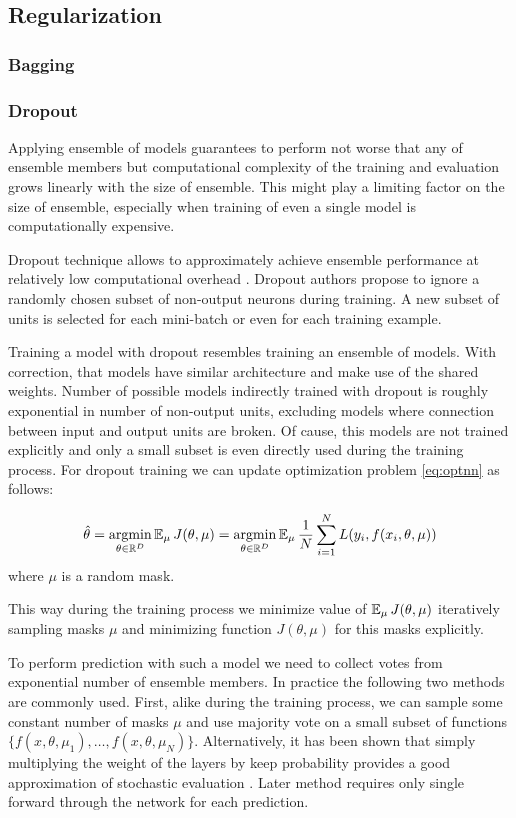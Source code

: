 \subsection{Regularization}

\subsubsection{Bagging}
\subsubsection{Dropout}

Applying ensemble of models guarantees to perform not worse that any of ensemble members but computational complexity of the training and evaluation grows linearly with the size of ensemble. This might play a limiting factor on the size of ensemble, especially when training of even a single model is computationally expensive.

Dropout technique allows to approximately achieve ensemble performance at relatively low computational overhead \cite{Srivastava2014}.
Dropout authors propose to ignore a randomly chosen subset of non-output neurons during training. A new subset of units is selected for each mini-batch or even for each training example.

Training a model with dropout resembles training an ensemble of models. With correction, that models have similar architecture and make use of the shared weights. Number of possible models indirectly trained with dropout is roughly exponential in number of non-output units, excluding models where connection between input and output units are broken. Of cause, this models are not trained explicitly and only a small subset is even directly used during the training process. For dropout training we can update optimization problem \ref{eq:optnn} as follows:

\begin{equation}\label{eq:optnndo}
  \hat{\theta} = \operatorname*{argmin}_{\theta \in \Bbb{R}^D} \operatorname{\mathbb{E}}_\mu J(\theta, \mu) = \operatorname*{argmin}_{\theta \in \Bbb{R}^D} \operatorname{\mathbb{E}}_\mu \frac{1}{N} \sum_{i=1}^{N} L(y_i, f(x_i, \theta, \mu))
\end{equation}
where $\mu$ is a random mask.

This way during the training process we minimize value of $\operatorname{\mathbb{E}}_\mu J(\theta, \mu)$ iteratively sampling masks $\mu$ and minimizing function $J(\theta, \mu)$ for this masks explicitly.

To perform prediction with such a model we need to collect votes from exponential number of ensemble members.
In practice the following two methods are commonly used. First, alike during the training process, we can sample some constant number of masks $\mu$ and use majority vote on a small subset of functions $\{f(x, \theta, \mu_1), \ldots, f(x, \theta, \mu_N)\}$. Alternatively, it has been shown that simply multiplying the weight of the layers by keep probability provides a good approximation of stochastic evaluation \cite{Srivastava2014}. Later method requires only single forward through the network for each prediction.

